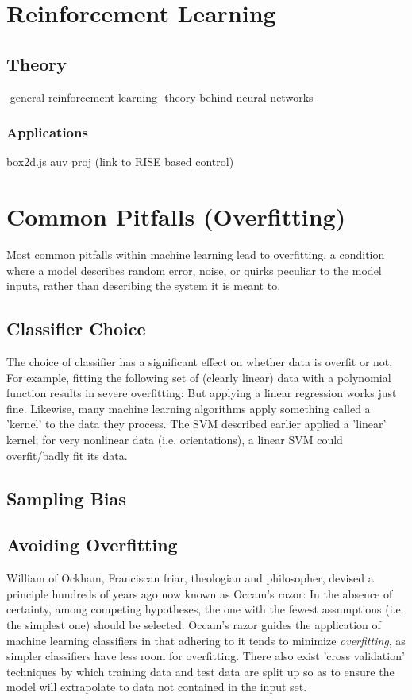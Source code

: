 \documentclass[11pt]{article}
\begin{document}
\section{Reinforcement Learning}
\subsection{Theory}
-general reinforcement learning
-theory behind neural networks
\subsubsection{Applications}
box2d.js
auv proj (link to RISE based control)

\section{Common Pitfalls (Overfitting)}
Most common pitfalls within machine learning lead to overfitting, a condition where a model describes random error, noise, or quirks peculiar to the model inputs, rather than describing the system it is meant to.
\subsection{Classifier Choice}
The choice of classifier has a significant effect on whether data is overfit or not. For example, fitting the following set of (clearly linear) data with a polynomial function results in severe overfitting: 
But applying a linear regression works just fine. Likewise, many machine learning algorithms apply something called a 'kernel' to the data they process. The SVM described earlier applied a 'linear' kernel; for very nonlinear data (i.e. orientations), a linear SVM could overfit/badly fit its data.
\subsection{Sampling Bias}
\subsection{Avoiding Overfitting}
William of Ockham, Franciscan friar, theologian and philosopher, devised a principle hundreds of years ago now known as Occam's razor: In the absence of certainty, among competing hypotheses, the one with the fewest assumptions (i.e. the simplest one) should be selected. Occam's razor guides the application of machine learning classifiers in that adhering to it tends to minimize \textit{overfitting}, as simpler classifiers have less room for overfitting. There also exist 'cross validation' techniques by which training data and test data are split up so as to ensure the model will extrapolate to data not contained in the input set.
\end{document}

